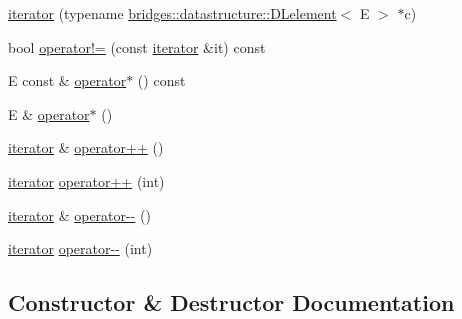 \begin{DoxyCompactItemize}
\item 
\hyperlink{classbridges_1_1datastructure_1_1_d_lelement_1_1_d_lelement__listhelper_1_1iterator_a2f695af845d30dca74dd53944baeb4af}{iterator} (typename \hyperlink{classbridges_1_1datastructure_1_1_d_lelement}{bridges\+::datastructure\+::\+D\+Lelement}$<$ E $>$ $\ast$c)
\item 
bool \hyperlink{classbridges_1_1datastructure_1_1_d_lelement_1_1_d_lelement__listhelper_1_1iterator_acb89f34294e87b6f01b36489ba26dd44}{operator!=} (const \hyperlink{classbridges_1_1datastructure_1_1_d_lelement_1_1_d_lelement__listhelper_1_1iterator}{iterator} \&it) const
\item 
E const  \& \hyperlink{classbridges_1_1datastructure_1_1_d_lelement_1_1_d_lelement__listhelper_1_1iterator_a4f4775a38aeedc8cb5369d08f364f5ce}{operator$\ast$} () const
\item 
E \& \hyperlink{classbridges_1_1datastructure_1_1_d_lelement_1_1_d_lelement__listhelper_1_1iterator_a2ffec29bdc6c10a6cf995a1272df9304}{operator$\ast$} ()
\item 
\hyperlink{classbridges_1_1datastructure_1_1_d_lelement_1_1_d_lelement__listhelper_1_1iterator}{iterator} \& \hyperlink{classbridges_1_1datastructure_1_1_d_lelement_1_1_d_lelement__listhelper_1_1iterator_ac94ddeebad62e2411d044ba878735742}{operator++} ()
\item 
\hyperlink{classbridges_1_1datastructure_1_1_d_lelement_1_1_d_lelement__listhelper_1_1iterator}{iterator} \hyperlink{classbridges_1_1datastructure_1_1_d_lelement_1_1_d_lelement__listhelper_1_1iterator_ab77df653d614560e6b32728c9b7c1b8e}{operator++} (int)
\item 
\hyperlink{classbridges_1_1datastructure_1_1_d_lelement_1_1_d_lelement__listhelper_1_1iterator}{iterator} \& \hyperlink{classbridges_1_1datastructure_1_1_d_lelement_1_1_d_lelement__listhelper_1_1iterator_aee40290dcead96bd9ee391119ab72f9d}{operator-\/-\/} ()
\item 
\hyperlink{classbridges_1_1datastructure_1_1_d_lelement_1_1_d_lelement__listhelper_1_1iterator}{iterator} \hyperlink{classbridges_1_1datastructure_1_1_d_lelement_1_1_d_lelement__listhelper_1_1iterator_abc3e358cdc2316d532f807b0f9958d15}{operator-\/-\/} (int)
\end{DoxyCompactItemize}


\subsection{Constructor \& Destructor Documentation}
\mbox{\label{classbridges_1_1datastructure_1_1_d_lelement_1_1_d_lelement__listhelper_1_1iterator_a2f695af845d30dca74dd53944baeb4af}} 
